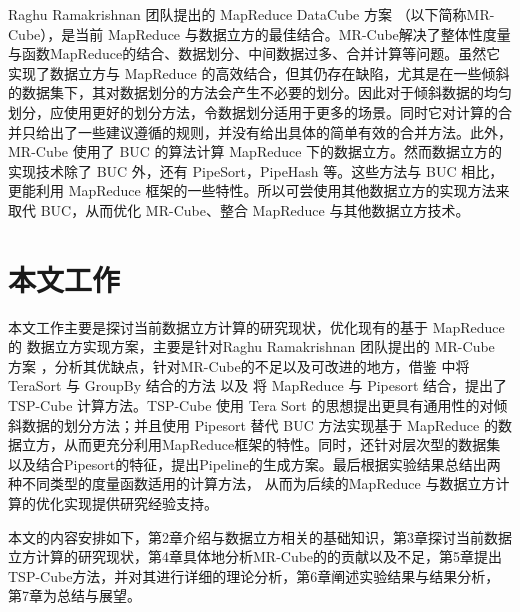 Raghu Ramakrishnan 团队提出的 MapReduce DataCube 方案 \cite{nandi2012data} \cite{nandi2011distributed}（以下简称MR-Cube），是当前 MapReduce 与数据立方的最佳结合。MR-Cube解决了整体性度量与函数MapReduce的结合、数据划分、中间数据过多、合并计算等问题。虽然它实现了数据立方与 MapReduce 的高效结合，但其仍存在缺陷，尤其是在一些倾斜的数据集下，其对数据划分的方法会产生不必要的划分。因此对于倾斜数据的均匀划分，应使用更好的划分方法，令数据划分适用于更多的场景。同时它对计算的合并只给出了一些建议遵循的规则，并没有给出具体的简单有效的合并方法。此外，MR-Cube 使用了 BUC \cite{beyer1999bottom} 的算法计算 MapReduce 下的数据立方。然而数据立方的实现技术除了 BUC 外，还有 PipeSort，PipeHash \cite{agarwal1996computation} 等。这些方法与 BUC 相比，更能利用 MapReduce 框架的一些特性。所以可尝使用其他数据立方的实现方法来取代 BUC，从而优化 MR-Cube、整合 MapReduce 与其他数据立方技术。










\section{本文工作}


本文工作主要是探讨当前数据立方计算的研究现状，优化现有的基于 MapReduce 的 数据立方实现方案，主要是针对Raghu Ramakrishnan 团队提出的 MR-Cube 方案 \cite{nandi2012data} \cite{nandi2011distributed}，分析其优缺点，针对MR-Cube的不足以及可改进的地方，借鉴\cite{tao2013minimal} 中将TeraSort 与 GroupBy 结合的方法 以及 将 MapReduce 与 Pipesort 结合，提出了TSP-Cube 计算方法。TSP-Cube 使用 Tera Sort 的思想提出更具有通用性的对倾斜数据的划分方法；并且使用 Pipesort 替代 BUC 方法实现基于 MapReduce 的数据立方，从而更充分利用MapReduce框架的特性。同时，还针对层次型的数据集以及结合Pipesort的特征，提出Pipeline的生成方案。最后根据实验结果总结出两种不同类型的度量函数适用的计算方法， 从而为后续的MapReduce 与数据立方计算的优化实现提供研究经验支持。


本文的内容安排如下，第2章介绍与数据立方相关的基础知识，第3章探讨当前数据立方计算的研究现状，第4章具体地分析MR-Cube的的贡献以及不足，第5章提出TSP-Cube方法，并对其进行详细的理论分析，第6章阐述实验结果与结果分析，第7章为总结与展望。



